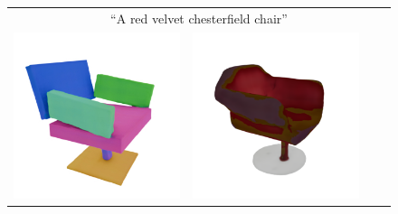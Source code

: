 \begin{figure}
    \centering
    \setlength{\tabcolsep}{1pt}
    {\small
    \begin{tabular}{cccc}
        \multicolumn{4}{c}{``A red velvet chesterfield chair''} \\
                \includegraphics[width=0.24\linewidth, trim=20 20 40 40, clip]{images/editings/spice-e/velvet_chair/guidance/chair_0000.jpg} &
                \includegraphics[width=0.24\linewidth, trim=40 40 60 60, clip]{images/editings/spice-e/velvet_chair/spice-e/shap-e_tile_0.png} &


\end{tabular}}
\end{figure}
